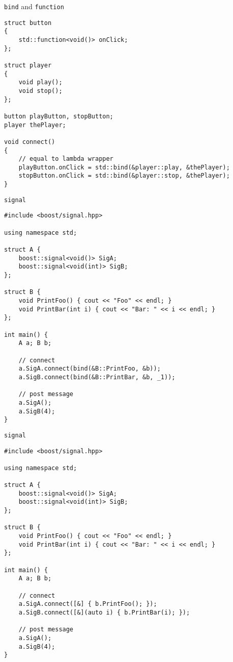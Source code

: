 \documentclass{beamer}
\begin{document}
\begin{frame}[fragile]{{\tt bind} and {\tt function}}
\small
\begin{lstlisting}
struct button 
{
    std::function<void()> onClick;
};

struct player
{
    void play();
    void stop();
};

button playButton, stopButton;
player thePlayer;

void connect()
{
    // equal to lambda wrapper
    playButton.onClick = std::bind(&player::play, &thePlayer);
    stopButton.onClick = std::bind(&player::stop, &thePlayer);
}

\end{lstlisting}
\end{frame}

\begin{frame}[fragile]{{\tt signal}}
\small
\begin{lstlisting}
#include <boost/signal.hpp>

using namespace std;

struct A {
    boost::signal<void()> SigA;
    boost::signal<void(int)> SigB;
};

struct B {
    void PrintFoo() { cout << "Foo" << endl; }
    void PrintBar(int i) { cout << "Bar: " << i << endl; }
};

int main() {
    A a; B b;

    // connect
    a.SigA.connect(bind(&B::PrintFoo, &b));
    a.SigB.connect(bind(&B::PrintBar, &b, _1));

    // post message
    a.SigA();
    a.SigB(4);
}
\end{lstlisting}
\end{frame}

\begin{frame}[fragile]{{\tt signal}}
\small
\begin{lstlisting}
#include <boost/signal.hpp>

using namespace std;

struct A {
    boost::signal<void()> SigA;
    boost::signal<void(int)> SigB;
};

struct B {
    void PrintFoo() { cout << "Foo" << endl; }
    void PrintBar(int i) { cout << "Bar: " << i << endl; }
};

int main() {
    A a; B b;

    // connect
    a.SigA.connect([&] { b.PrintFoo(); });
    a.SigB.connect([&](auto i) { b.PrintBar(i); });

    // post message
    a.SigA();
    a.SigB(4);
}
\end{lstlisting}
\end{frame}
\end{document}
